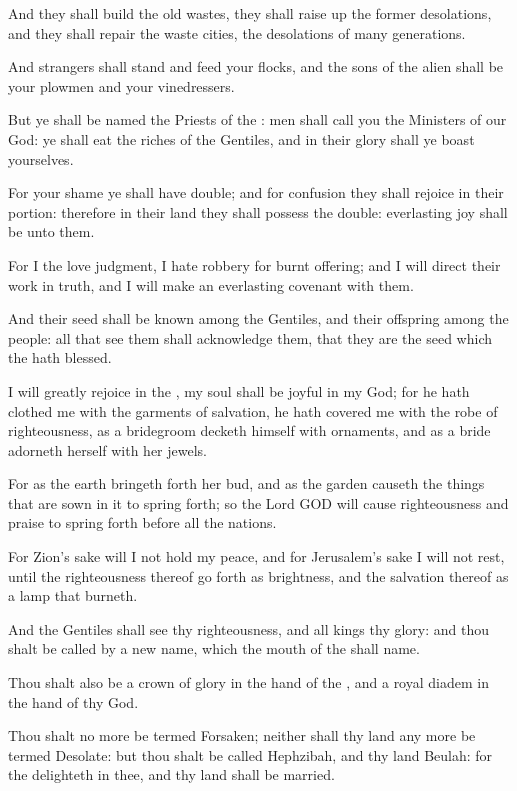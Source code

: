 \Verse And they shall build the old wastes, they shall raise up the former desolations, and they shall repair the waste cities, the desolations of many generations.

\Verse And strangers shall stand and feed your flocks, and the sons of the alien shall be your plowmen and your vinedressers.

\Verse But ye shall be named the Priests of the \LORD: men shall call you the Ministers of our God: ye shall eat the riches of the Gentiles, and in their glory shall ye boast yourselves.

\Verse For your shame ye shall have double; and for confusion they shall rejoice in their portion: therefore in their land they shall possess the double: everlasting joy shall be unto them.

\Verse For I the \LORD love judgment, I hate robbery for burnt offering; and I will direct their work in truth, and I will make an everlasting covenant with them.

\Verse And their seed shall be known among the Gentiles, and their offspring among the people: all that see them shall acknowledge them, that they are the seed which the \LORD hath blessed.

\Verse I will greatly rejoice in the \LORD, my soul shall be joyful in my God; for he hath clothed me with the garments of salvation, he hath covered me with the robe of righteousness, as a bridegroom decketh himself with ornaments, and as a bride adorneth herself with her jewels.

\Verse For as the earth bringeth forth her bud, and as the garden causeth the things that are sown in it to spring forth; so the Lord GOD will cause righteousness and praise to spring forth before all the nations.


\Chapter
\Verse For Zion's sake will I not hold my peace, and for Jerusalem's sake I will not rest, until the righteousness thereof go forth as brightness, and the salvation thereof as a lamp that burneth.

\Verse And the Gentiles shall see thy righteousness, and all kings thy glory: and thou shalt be called by a new name, which the mouth of the \LORD shall name.

\Verse Thou shalt also be a crown of glory in the hand of the \LORD, and a royal diadem in the hand of thy God.

\Verse Thou shalt no more be termed Forsaken; neither shall thy land any more be termed Desolate: but thou shalt be called Hephzibah, and thy land Beulah: for the \LORD delighteth in thee, and thy land shall be married.

